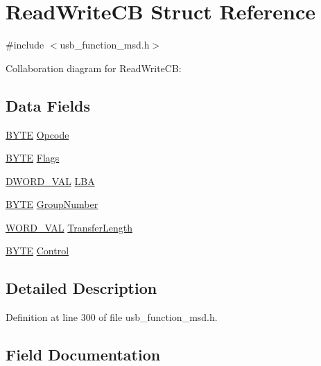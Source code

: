 \hypertarget{struct_read_write_c_b}{}\section{Read\+Write\+C\+B Struct Reference}
\label{struct_read_write_c_b}


{\ttfamily \#include $<$usb\+\_\+function\+\_\+msd.\+h$>$}



Collaboration diagram for Read\+Write\+C\+B\+:
\subsection*{Data Fields}
\begin{DoxyCompactItemize}
\item 
\hyperlink{_generic_type_defs_8h_a4ae1dab0fb4b072a66584546209e7d58}{B\+Y\+T\+E} \hyperlink{struct_read_write_c_b_a3ac7536b907732d60214ae553910eed9}{Opcode}
\item 
\hyperlink{_generic_type_defs_8h_a4ae1dab0fb4b072a66584546209e7d58}{B\+Y\+T\+E} \hyperlink{struct_read_write_c_b_a0e44f5f85bf9696d6acd4d0bfb3ec2b3}{Flags}
\item 
\hyperlink{union_d_w_o_r_d___v_a_l}{D\+W\+O\+R\+D\+\_\+\+V\+A\+L} \hyperlink{struct_read_write_c_b_a6999b5425894f3b14fe9b2bbd8bb794b}{L\+B\+A}
\item 
\hyperlink{_generic_type_defs_8h_a4ae1dab0fb4b072a66584546209e7d58}{B\+Y\+T\+E} \hyperlink{struct_read_write_c_b_a6016c3942d93a2a734fa1fa61f69747b}{Group\+Number}
\item 
\hyperlink{union_w_o_r_d___v_a_l}{W\+O\+R\+D\+\_\+\+V\+A\+L} \hyperlink{struct_read_write_c_b_abd21ba8461adac4d4a61c759664044bd}{Transfer\+Length}
\item 
\hyperlink{_generic_type_defs_8h_a4ae1dab0fb4b072a66584546209e7d58}{B\+Y\+T\+E} \hyperlink{struct_read_write_c_b_a5dc24656c27deb12af74c98930f0bfc5}{Control}
\end{DoxyCompactItemize}


\subsection{Detailed Description}


Definition at line 300 of file usb\+\_\+function\+\_\+msd.\+h.



\subsection{Field Documentation}
\hypertarget{struct_read_write_c_b_a5dc24656c27deb12af74c98930f0bfc5}{}
